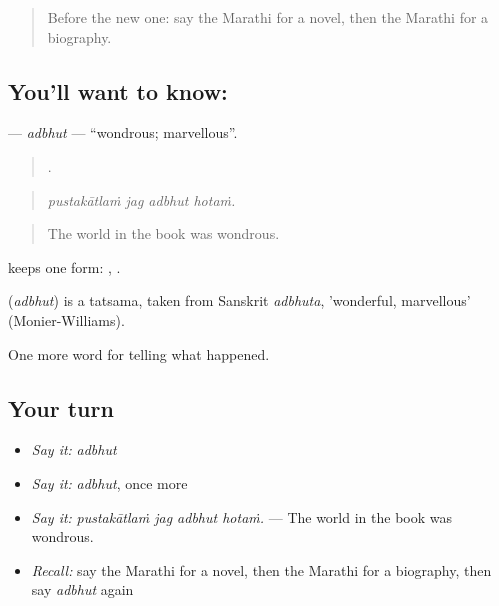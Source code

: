 \label{lesson:MR-C341-adbhut}



\begin{quote}
Before the new one: say the Marathi for a novel, then the Marathi for a biography.
\end{quote}

\subsection*{You'll want to know: }
\textbf{} — \emph{adbhut} — \textquotedblleft{}wondrous; marvellous\textquotedblright{}.

\begin{quote}
   .
\end{quote}

\begin{quote}
\emph{pustakātlaṁ jag adbhut hotaṁ.}
\end{quote}

\begin{quote}
The world in the book was wondrous.
\end{quote}

 keeps one form:  ,  .

\begin{cousinweb}
\textbf{} (\emph{adbhut}) is a tatsama, taken from Sanskrit \emph{adbhuta}, 'wonderful, marvellous' (Monier-Williams).
\end{cousinweb}

\begin{grammarlens}[title={What you've built}]
One more word for telling what happened.
\end{grammarlens}

\subsection*{Your turn}
\begin{itemize}
\raggedright
  \item \emph{Say it:} \emph{adbhut}
  \item \emph{Say it:} \emph{adbhut}, once more
  \item \emph{Say it:} \emph{pustakātlaṁ jag adbhut hotaṁ.} — The world in the book was wondrous.
  \item \emph{Recall:} say the Marathi for a novel, then the Marathi for a biography, then say \emph{adbhut} again
\end{itemize}

